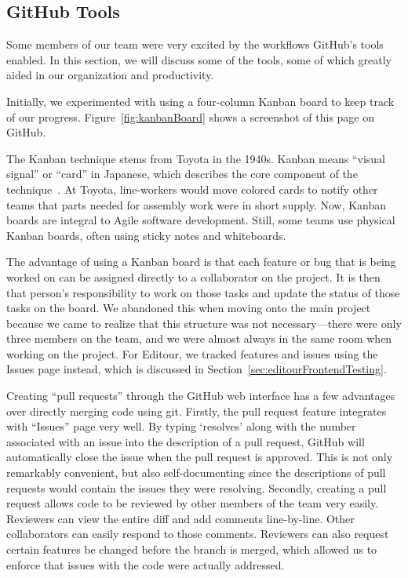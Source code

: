 \documentclass[a4paper, 10pt, american, titlepage]{article}
\begin{document}
\subsection{GitHub Tools}
\label{sec:gitHubTools}

Some members of our team were very excited by the workflows GitHub's tools
enabled. In this section, we will discuss some of the tools, some of which
greatly aided in our organization and productivity.

Initially, we experimented with using a four-column Kanban board to keep track
of our progress. Figure~\ref{fig:kanbanBoard} shows a screenshot of this page on
GitHub.

The Kanban technique stems from Toyota in the 1940s. Kanban means ``visual
signal'' or ``card'' in Japanese, which describes the core component of the
technique~\autocite{terry2019}. At Toyota, line-workers would move colored cards
to notify other teams that parts needed for assembly work were in short supply.
Now, Kanban boards are integral to Agile software development. Still, some teams
use physical Kanban boards, often using sticky notes and whiteboards.

The advantage of using a Kanban board is that each feature or bug that
is being worked on can be assigned directly to a collaborator on the project. It
is then that person's responsibility to work on those tasks and update the
status of those tasks on the board. We abandoned this when moving onto the main
project because we came to realize that this structure was not necessary---there
were only three members on the team, and we were almost always in the same room
when working on the project. For Editour, we tracked features and issues using
the Issues page instead, which is discussed in
Section~\ref{sec:editourFrontendTesting}.

Creating ``pull requests'' through the GitHub web interface has a few advantages
over directly merging code using git. Firstly, the pull request feature
integrates with ``Issues'' page very well. By typing `resolves' along with the
number associated with an issue into the description of a pull request, GitHub
will automatically close the issue when the pull request is approved. This is
not only remarkably convenient, but also self-documenting since the descriptions
of pull requests would contain the issues they were resolving. Secondly,
creating a pull request allows code to be reviewed by other members of the team
very easily. Reviewers can view the entire diff and add comments line-by-line.
Other collaborators can easily respond to those comments. Reviewers can also
request certain features be changed before the branch is merged, which allowed
us to enforce that issues with the code were actually addressed.
\end{document}
